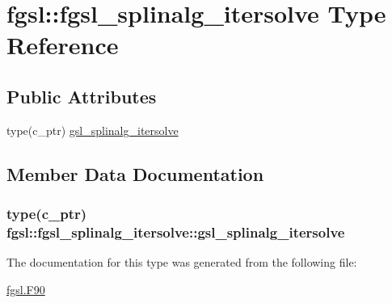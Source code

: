\hypertarget{structfgsl_1_1fgsl__splinalg__itersolve}{}\section{fgsl\+:\+:fgsl\+\_\+splinalg\+\_\+itersolve Type Reference}
\label{structfgsl_1_1fgsl__splinalg__itersolve}
\subsection*{Public Attributes}
\begin{DoxyCompactItemize}
\item 
type(c\+\_\+ptr) \hyperlink{structfgsl_1_1fgsl__splinalg__itersolve_a61c737454fe35542b825b6abbf6dbb49}{gsl\+\_\+splinalg\+\_\+itersolve}
\end{DoxyCompactItemize}


\subsection{Member Data Documentation}
\hypertarget{structfgsl_1_1fgsl__splinalg__itersolve_a61c737454fe35542b825b6abbf6dbb49}{}
\subsubsection[{gsl\+\_\+splinalg\+\_\+itersolve}]{\setlength{\rightskip}{0pt plus 5cm}type(c\+\_\+ptr) fgsl\+::fgsl\+\_\+splinalg\+\_\+itersolve\+::gsl\+\_\+splinalg\+\_\+itersolve}\label{structfgsl_1_1fgsl__splinalg__itersolve_a61c737454fe35542b825b6abbf6dbb49}


The documentation for this type was generated from the following file\+:\begin{DoxyCompactItemize}
\item 
\hyperlink{fgsl_8F90}{fgsl.\+F90}\end{DoxyCompactItemize}
